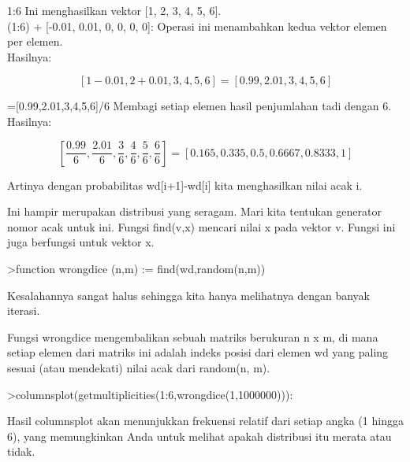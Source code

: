 \documentclass{article}
\begin{document}
\begin{eulernotebook}
\begin{eulercomment}
\begin{eulercomment}
\begin{eulercomment}
1:6 Ini menghasilkan vektor [1, 2, 3, 4, 5, 6].\\
(1:6) + [-0.01, 0.01, 0, 0, 0, 0]: Operasi ini menambahkan kedua
vektor elemen per elemen.\\
Hasilnya: \\
\end{eulercomment}
\begin{eulerformula}
\[
[1-0.01, 2+0.01, 3, 4, 5, 6] = [0.99, 2.01, 3, 4, 5, 6]
\]
\end{eulerformula}
\begin{eulercomment}
[1-0.01,2+0.01,3,4,5,6]=[0.99,2.01,3,4,5,6]/6 Membagi setiap elemen
hasil penjumlahan tadi dengan 6.\\
Hasilnya:\\
\end{eulercomment}
\begin{eulerformula}
\[
[\frac {0.99}{6}, \frac {2.01}{6}, \frac {3}{6}, \frac {4}{6}, \frac {5}{6}, \frac {6}{6}] = [0.165, 0.335, 0.5,0.6667, 0.8333, 1]
\]
\end{eulerformula}
\begin{eulercomment}
Artinya dengan probabilitas wd[i+1]-wd[i] kita menghasilkan nilai acak
i.

Ini hampir merupakan distribusi yang seragam. Mari kita tentukan
generator nomor acak untuk ini. Fungsi find(v,x) mencari nilai x pada
vektor v. Fungsi ini juga berfungsi untuk vektor x.
\end{eulercomment}
\begin{eulerprompt}
>function wrongdice (n,m) := find(wd,random(n,m))
\end{eulerprompt}
\begin{eulercomment}
Kesalahannya sangat halus sehingga kita hanya melihatnya dengan banyak
iterasi.

Fungsi wrongdice mengembalikan sebuah matriks berukuran n x m, di mana
setiap elemen dari matriks ini adalah indeks posisi dari elemen wd
yang paling sesuai (atau mendekati) nilai acak dari random(n, m).
\end{eulercomment}
\begin{eulerprompt}
>columnsplot(getmultiplicities(1:6,wrongdice(1,1000000))):
\end{eulerprompt}
\begin{eulercomment}
Hasil columnsplot akan menunjukkan frekuensi relatif dari setiap angka
(1 hingga 6), yang memungkinkan Anda untuk melihat apakah distribusi
itu merata atau tidak.


\end{eulercomment}
\end{eulercomment}
\end{eulercomment}
\end{eulernotebook}
\end{document}
